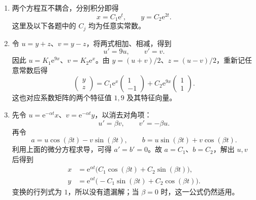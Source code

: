 \documentclass[UTF8,a4paper,11pt]{ctexart}
\newcommand{\e}{\mathrm e}
\begin{document}
\begin{solution}
\begin{enumerate}[label=(\arabic*)]
\item 两个方程互不耦合，分别积分即得
\[
\boxed{x=C_1\e^t,\qquad y=C_2\e^{2t}.}
\]
这里及以下各题中的 $C_j$ 均为任意实常数。

\item 令 $u=y+z$、$v=y-z$，将两式相加、相减，得到
\[
u'=9u,\qquad v'=v.
\]
因此 $u=K_1\e^{9x}$、$v=K_2\e^x$。由
$y=(u+v)/2$、$z=(u-v)/2$，重新记任意常数后得
\[
\boxed{
\begin{pmatrix}y\\z\end{pmatrix}
=C_1\e^x\begin{pmatrix}1\\-1\end{pmatrix}
+C_2\e^{9x}\begin{pmatrix}1\\1\end{pmatrix}.}
\]
这也对应系数矩阵的两个特征值 $1,9$ 及其特征向量。

\item 先令 $u=\e^{-\alpha t}x$、$v=\e^{-\alpha t}y$，以消去对角项：
\[
u'=\beta v,\qquad v'=-\beta u.
\]
再令
\[
a=u\cos(\beta t)-v\sin(\beta t),\qquad
b=u\sin(\beta t)+v\cos(\beta t).
\]
利用上面的微分方程求导，可得 $a'=b'=0$。故 $a=C_1$、$b=C_2$，解出 $u,v$ 后得到
\[
\boxed{
\begin{aligned}
x&=\e^{\alpha t}\bigl(C_1\cos(\beta t)+C_2\sin(\beta t)\bigr),\\
y&=\e^{\alpha t}\bigl(-C_1\sin(\beta t)+C_2\cos(\beta t)\bigr).
\end{aligned}}
\]
变换的行列式为 $1$，所以没有遗漏解；当 $\beta=0$ 时，这一公式仍然适用。
\end{enumerate}
\end{solution}
\end{document}
